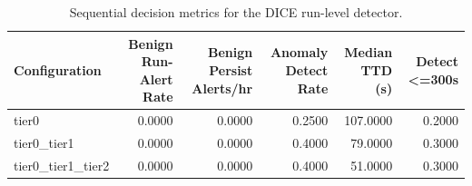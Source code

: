 \begin{table}[t]
\centering
\caption{Sequential decision metrics for the DICE run-level detector.}
\label{tab:dice_sequential_metrics}
\footnotesize
\begin{tabular}{lrrrrr}
\toprule
Configuration & Benign Run-Alert Rate & Benign Persist Alerts/hr & Anomaly Detect Rate & Median TTD (s) & Detect <=300s \\
\midrule
tier0 & 0.0000 & 0.0000 & 0.2500 & 107.0000 & 0.2000 \\
tier0_tier1 & 0.0000 & 0.0000 & 0.4000 & 79.0000 & 0.3000 \\
tier0_tier1_tier2 & 0.0000 & 0.0000 & 0.4000 & 51.0000 & 0.3000 \\
\bottomrule
\end{tabular}

\end{table}
